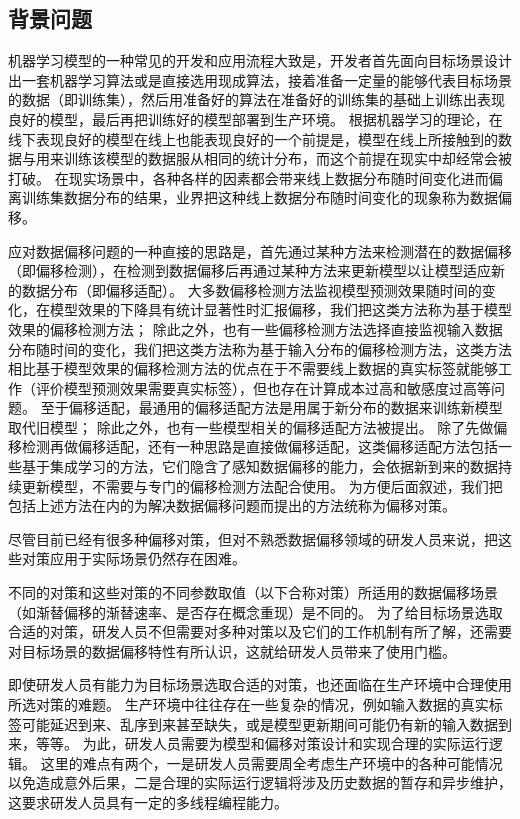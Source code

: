 \subsection{背景问题}

机器学习模型的一种常见的开发和应用流程大致是，开发者首先面向目标场景设计出一套机器学习算法或是直接选用现成算法，接着准备一定量的能够代表目标场景的数据（即训练集），然后用准备好的算法在准备好的训练集的基础上训练出表现良好的模型，最后再把训练好的模型部署到生产环境。
根据机器学习的理论，在线下表现良好的模型在线上也能表现良好的一个前提是，模型在线上所接触到的数据与用来训练该模型的数据服从相同的统计分布，而这个前提在现实中却经常会被打破。
在现实场景中，各种各样的因素都会带来线上数据分布随时间变化进而偏离训练集数据分布的结果，业界把这种线上数据分布随时间变化的现象称为数据偏移。

应对数据偏移问题的一种直接的思路是，首先通过某种方法来检测潜在的数据偏移（即偏移检测），在检测到数据偏移后再通过某种方法来更新模型以让模型适应新的数据分布（即偏移适配）。
大多数偏移检测方法监视模型预测效果随时间的变化，在模型效果的下降具有统计显著性时汇报偏移，我们把这类方法称为基于模型效果的偏移检测方法；
除此之外，也有一些偏移检测方法选择直接监视输入数据分布随时间的变化，我们把这类方法称为基于输入分布的偏移检测方法，这类方法相比基于模型效果的偏移检测方法的优点在于不需要线上数据的真实标签就能够工作（评价模型预测效果需要真实标签），但也存在计算成本过高和敏感度过高等问题。
至于偏移适配，最通用的偏移适配方法是用属于新分布的数据来训练新模型取代旧模型；
除此之外，也有一些模型相关的偏移适配方法被提出。
除了先做偏移检测再做偏移适配，还有一种思路是直接做偏移适配，这类偏移适配方法包括一些基于集成学习的方法，它们隐含了感知数据偏移的能力，会依据新到来的数据持续更新模型，不需要与专门的偏移检测方法配合使用。
为方便后面叙述，我们把包括上述方法在内的为解决数据偏移问题而提出的方法统称为偏移对策。

尽管目前已经有很多种偏移对策，但对不熟悉数据偏移领域的研发人员来说，把这些对策应用于实际场景仍然存在困难。

不同的对策和这些对策的不同参数取值（以下合称对策）所适用的数据偏移场景（如渐替偏移的渐替速率、是否存在概念重现）是不同的。
为了给目标场景选取合适的对策，研发人员不但需要对多种对策以及它们的工作机制有所了解，还需要对目标场景的数据偏移特性有所认识，这就给研发人员带来了使用门槛。

即使研发人员有能力为目标场景选取合适的对策，也还面临在生产环境中合理使用所选对策的难题。
生产环境中往往存在一些复杂的情况，例如输入数据的真实标签可能延迟到来、乱序到来甚至缺失，或是模型更新期间可能仍有新的输入数据到来，等等。
为此，研发人员需要为模型和偏移对策设计和实现合理的实际运行逻辑。
这里的难点有两个，一是研发人员需要周全考虑生产环境中的各种可能情况以免造成意外后果，二是合理的实际运行逻辑将涉及历史数据的暂存和异步维护，这要求研发人员具有一定的多线程编程能力。

